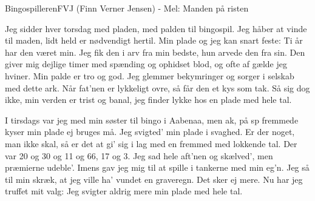 \begin{sang}{Bingospilleren}{FVJ (Finn Verner Jensen) - Mel: Manden på risten}
\begin{vers}
Jeg sidder hver torsdag med pladen, 
med palden til bingospil. 
Jeg håber at vinde til maden, 
lidt held er nødvendigt hertil. 
Min plade og jeg kan snart feste: 
Ti år har den været min. 
Jeg fik den i arv fra min bedste, 
hun arvede den fra sin. 
Den giver mig dejlige timer 
med spænding og ophidset blod, 
og ofte af gælde jeg hviner. 
Min palde er tro og god. 
Jeg glemmer bekymringer og sorger 
i selskab med dette ark. 
Når fat'nen er lykkeligt ovre, 
så får den et kys som tak. 
Så sig dog ikke, min verden er trist og banal, 
jeg finder lykke hos en plade med hele tal.
\end{vers}
\vfill
\begin{vers}
I tirsdags var jeg med min søster 
til bingo i Aabenaa, 
men ak, på sp fremmede kyser 
min plade ej bruges må. 
Jeg svigted' min plade i svaghed. 
Er der noget, man ikke skal, 
så er det at gi' sig i lag med 
en fremmed med lokkende tal. 
Der var 20 og 30 og 11 
og 66, 17 og 3. 
Jeg sad hele aft'nen og skælved', 
men præmierne udeble'. 
Imens gav jeg mig til at spille 
i tankerne med min eg'n. 
Jeg så til min skræk, at jeg ville 
ha' vundet en graveregn. 
Det sker ej mere. Nu har jeg truffet mit valg: 
Jeg svigter aldrig mere min plade med hele tal.
\end{vers}
\laps
\end{sang}